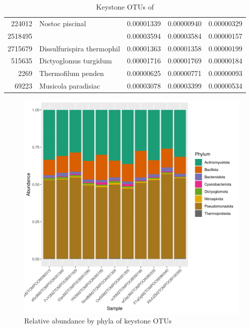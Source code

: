 \begin{table}[ht]
\begin{tabular}{rlrrr}
  224012 & Nostoc piscinal & 0.00001339 & 0.00000940 & 0.00000329 \\ 
  2518495 &   & 0.00003594 & 0.00003584 & 0.00000157 \\ 
  2715679 & Dissulfurispira thermophil & 0.00001363 & 0.00001358 & 0.00000199 \\ 
  515635 & Dictyoglomus turgidum & 0.00001716 & 0.00001769 & 0.00000184 \\ 
  2269 & Thermofilum penden & 0.00000625 & 0.00000771 & 0.00000093 \\ 
  69223 & Musicola paradisiac & 0.00003078 & 0.00003399 & 0.00000534 \\ 
   \hline
\end{tabular}
\caption{Keystone OTUs of } 
\end{table}
\begin{figure}
\centering
\includegraphics[scale = 0.8]{tomate_aleatorio1_2.csv_relative_abundance_Phylum.png}
\caption{Relative abundance by phyla of keystone OTUs }
\label{fig:tomate_aleatorio1_2.csv_phyla}
\end{figure}
